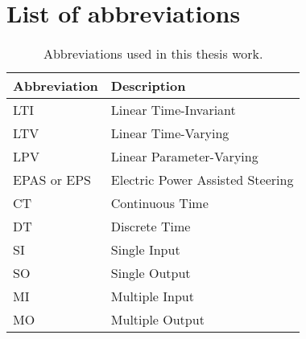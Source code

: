 \clearpage
\section*{List of abbreviations}

\begin{table}[ht]
	\centering
	\begin{tabular}{l l}
		\toprule
			Abbreviation 	&	Description							\\
		\midrule
			LTI 			& 	Linear Time-Invariant 				\\
			LTV				& 	Linear Time-Varying 				\\
			LPV 			& 	Linear Parameter-Varying 			\\
			EPAS or EPS		&	Electric Power Assisted Steering	\\
			CT 				& 	Continuous Time 					\\
			DT				&	Discrete Time						\\
			SI 				& 	Single Input 						\\
			SO				&	Single Output						\\
			MI 				& 	Multiple Input 						\\
			MO				&	Multiple Output						\\
		\bottomrule
	\end{tabular}
	\caption{Abbreviations used in this thesis work.}
\end{table}
